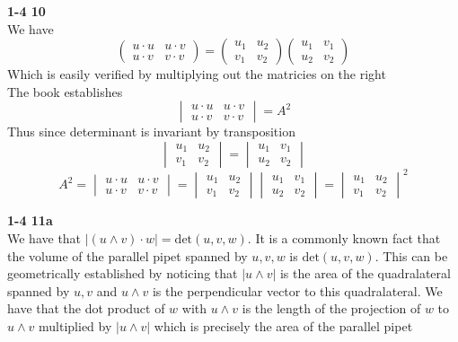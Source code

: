 \documentclass[12pt]{article}
\newenvironment{ques}[1]{\textbf{#1}\vspace{1 mm}\\ }{\bigskip}
\theoremstyle{definition}
\renewcommand{\det}{\text{det}}
\begin{document}
\begin{ques}{1-4 10}
	We have
	$$
	\begin{pmatrix}
		u \cdot u & u \cdot v \\
		u \cdot v & v \cdot v 
	\end{pmatrix}
	=
	\begin{pmatrix}
		u_1 & u_2\\
		v_1 & v_2
	\end{pmatrix}
	\begin{pmatrix}
		u_1 & v_1\\
		u_2 & v_2
	\end{pmatrix}
	$$
	Which is easily verified by multiplying out the matricies on the right\\
	The book establishes 
	$$
	\begin{vmatrix}
		u \cdot u & u \cdot v \\
		u \cdot v & v \cdot v 
	\end{vmatrix} = A^2
	$$
	Thus since determinant is invariant by transposition
	$$
	\begin{vmatrix}
		u_1 & u_2\\
		v_1 & v_2
	\end{vmatrix}
	=
	\begin{vmatrix}
		u_1 & v_1\\
		u_2 & v_2
	\end{vmatrix}
	$$
	$$A^2 = 
	\begin{vmatrix}
		u \cdot u & u \cdot v \\
		u \cdot v & v \cdot v 
	\end{vmatrix} 
	=
	\begin{vmatrix}
		u_1 & u_2\\
		v_1 & v_2
	\end{vmatrix}
	\begin{vmatrix}
		u_1 & v_1\\
		u_2 & v_2
	\end{vmatrix}
	=
	\begin{vmatrix}
		u_1 & u_2\\
		v_1 & v_2
	\end{vmatrix}^2
	$$
\end{ques}

\begin{ques}{1-4 11a}
	We have that $|(u \wedge v) \cdot w| = \det(u,v,w)$. It is a commonly known
	fact that the volume of the parallel pipet spanned by $u,v,w$ is
	$\det(u,v,w)$. This can be geometrically established by noticing that $|u
	\wedge v|$ is the area of the quadralateral spanned by $u,v$ and $u \wedge
	v$ is the perpendicular vector to this quadralateral. We have that the dot
	product of $w$ with $u \wedge v$ is the length of the projection of $w$ to
	$u \wedge v$ multiplied by $|u \wedge v|$ which is precisely the area of
	the parallel pipet
\end{ques}
\end{document}
